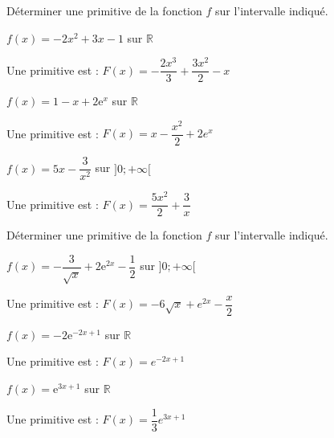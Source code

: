 \documentclass[11pt,a4paper]{article}  %
\begin{document}
	\graphicspath{{images/}}
	
	\begin{center}
		
		
		\fbox{
			\begin{minipage}[]{15cm}
				\begin{center}
					\LARGE{\rule{0.5cm}{0pt}\rule[-0.25cm]{0pt}{0.9cm}
						\textcolor{red}{Correction - Chapitre 04 - Primitives\\
						Exercices obligatoires}
					}
				\end{center}
			\end{minipage}
		}
	\end{center}
	
\vspace*{-0.5cm}
\exerciceDS{}
Déterminer une primitive de la fonction $f$ sur l'intervalle indiqué.

	\begin{enumMet}
	\item $f(x)=-2 x^2+3 x-1$ sur $\mathbb{R}$
	\begin{corrBox}
		Une primitive est : $F(x) = -\dfrac{2x^3}{3} + \dfrac{3x^2}{2} - x$
	\end{corrBox}
	\item $f(x)=1-x+2 \mathrm{e}^x$ sur $\mathbb{R}$
	\begin{corrBox}
		Une primitive est : $F(x) = x - \dfrac{x^2}{2} + 2e^x$
	\end{corrBox}
	\item $f(x)=5 x-\dfrac{3}{x^2}$ sur $] 0 ;+\infty[$
	\begin{corrBox}
		Une primitive est : $F(x) = \dfrac{5x^2}{2} + \dfrac{3}{x}$
	\end{corrBox}
\end{enumMet}


\vspace*{-0.5cm}
\exerciceDS{}
Déterminer une primitive de la fonction $f$ sur l'intervalle indiqué.

	\begin{enumMet}
	\item $f(x)=-\dfrac{3}{\sqrt{x}}+2 \mathrm{e}^{2 x}-\dfrac{1}{2}$ sur $] 0 ;+\infty[$
	\begin{corrBox}
		Une primitive est : $F(x) = -6\sqrt{x} + e^{2x} - \dfrac{x}{2}$
	\end{corrBox}
	\item $f(x)=-2 \mathrm{e}^{-2 x+1}$ sur $\mathbb{R}$
	\begin{corrBox}
		Une primitive est : $F(x) = e^{-2x+1}$
	\end{corrBox}
	\item $f(x)=\mathrm{e}^{3 x+1}$ sur $\mathbb{R}$
	\begin{corrBox}
		Une primitive est : $F(x) = \dfrac{1}{3}e^{3x+1}$
	\end{corrBox}
\end{enumMet}
\end{document}
